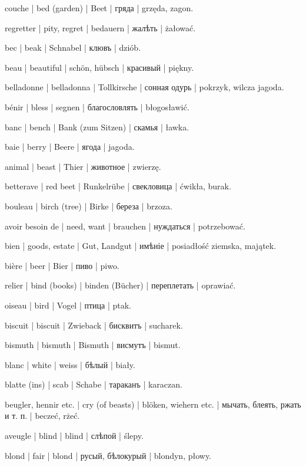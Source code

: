 \begin{outdent}{1em}
couche | bed (garden) | Beet | гряда | grzęda, zagon.

regretter | pity, regret | bedauern | жалѣть | żałować.

bec | beak | Schnabel | клювъ | dziób.

beau | beautiful | schön, hübsch | красивый | piękny.

belladonne | belladonna | Tollkirsche | сонная одурь | pokrzyk, wilcza jagoda.

bénir | bless | segnen | благословлять | błogosławić.

banc | bench | Bank (zum Sitzen) | скамья | ławka.

baie | berry | Beere | ягода | jagoda.

animal | beast | Thier | животное | zwierzę.

betterave | red beet | Runkelrübe | свекловица | ćwikła,
burak.

bouleau | birch (tree) | Birke | береза | brzoza.

avoir besoin de | need, want | brauchen | нуждаться | potrzebować.

bien | goods, estate | Gut, Landgut | имѣніе | posiadłość ziemska, majątek.

bière | beer | Bier | пиво | piwo.

relier | bind (books) | binden (Bücher) | переплетать | oprawiać.

oiseau | bird | Vogel | птица | ptak.

biscuit | biscuit | Zwieback | бисквитъ | sucharek.

bismuth | bismuth | Bismuth | висмутъ | bismut.

blanc | white | weiss | бѣлый | biały.

blatte (ins) | scab | Schabe | тараканъ | karaczan.

beugler, hennir etc. | cry (of beasts) | blöken, wiehern etc. | мычать, блеять, ржать и т. п. | beczeć, rżeć.

aveugle | blind | blind | слѣпой | ślepy.

blond | fair | blond | русый, бѣлокурый | blondyn, płowy.


\end{outdent}
